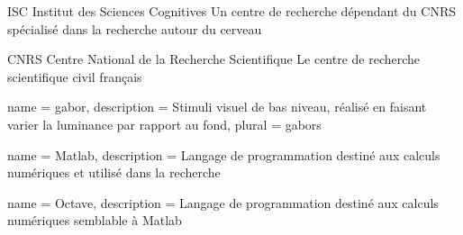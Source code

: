   {ISC}
  {Institut des Sciences Cognitives}
  {Un centre de recherche dépendant du \gls{CNRS} spécialisé dans la recherche autour du cerveau}

  {CNRS}
  {Centre National de la Recherche Scientifique}
  {Le centre de recherche scientifique civil français}

 {
  name = gabor,
  description = {Stimuli visuel de bas niveau, réalisé en faisant varier la luminance par rapport au fond},
  plural = gabors
}


 {
  name = Matlab,
  description = {Langage de programmation destiné aux calculs numériques et utilisé dans la recherche}
}

 {
  name = Octave,
  description = {Langage de programmation destiné aux calculs numériques semblable à \gls{Matlab}}
}